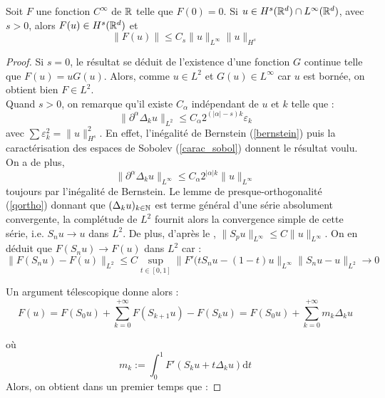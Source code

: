 \documentclass[11pt,a4paper]{article}
\begin{document}
\begin{lemma}
Soit $F$ une fonction $C^{\infty}$ de $\mathbb R$ telle que $F(0)=0$. Si $u\in H^s(\mathbb R^d)\cap L^{\infty}(\mathbb R^d) $, avec $s>0 $, alors $F(u) \in H^s(\mathbb R^d)$ et 
\begin{equation}
\|F(u)\| \leq C_s \|u\|_{L^{\infty}} \|u\|_{H^s}
\end{equation}
\end{lemma}

\begin{proof}
Si $s=0$, le résultat se déduit de l'existence d'une fonction $G$ continue telle que $F(u)=uG(u)$. Alors, comme $u\in L^2$ et $G(u) \in L^{\infty}$ car $u$ est bornée, on obtient bien $F\in L^2$. \\
Quand $s>0$, on remarque qu'il existe $C_\alpha$  indépendant de $u$ et $k$ telle que  : 
\begin{equation}\label{ineq_l2}
\|\partial^\alpha \Delta_k u \|_{L^2} \leq C_\alpha 2^{(|\alpha|-s)k} \varepsilon_k
\end{equation}
avec $\sum \varepsilon_k^2 =  \|u\|_{H^s}^2$. En effet, l'inégalité de Bernstein (\ref{bernstein}) puis la caractérisation des espaces de Sobolev (\ref{carac_sobol}) donnent le résultat voulu. On a de plus,
\begin{equation}\label{ineq_unif}
\|\partial^\alpha \Delta_k u \|_{L^{\infty}} \leq C_\alpha 2^{|\alpha|k} \|u\|_{L^{\infty}}
\end{equation}
toujours par l'inégalité de Bernstein. Le lemme de presque-orthogonalité (\ref{qortho}) donnant que $(\Delta_k u)_{k\in \mathbb N}$ est terme général d'une série absolument convergente, la complétude de $L^2$ fournit alors la convergence simple de cette série, i.e. $S_nu \to u$ dans $L^2$. De plus, d'après le ,  $\|S_pu\|_{L^\infty} \leq C \|u\|_{L^\infty}$. On en déduit que $F(S_nu) \to F(u)$ dans $L^2$ car :
\[ \| F(S_nu) - F(u)\|_{L^2} \leq C \sup_{t\in[0,1]} \|F'(tS_nu- (1-t)u \|_{L^\infty}\|S_nu-u\|_{L^2} \to 0 \]

Un argument télescopique donne alors : 
\begin{equation}\label{telesc}
F(u) = F(S_0 u) + \sum_{k=0}^{+\infty} F(S_{k+1} u) - F(S_k u) = F(S_0 u) + \sum_{k=0}^{+\infty} m_k \Delta_k u
\end{equation}

où \[m_k := \int_0^1 F'(S_ku + t\Delta_ku)\mathrm{d}t\]
Alors, on obtient dans un premier temps que : 


\end{proof}
\end{document}
